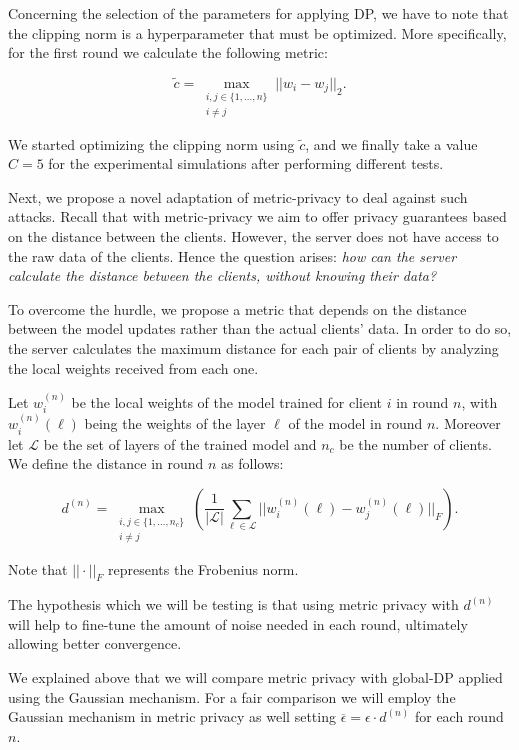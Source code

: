 \documentclass[5p,times]{elsarticle}
\begin{document}
Concerning the selection of the parameters for applying DP, we have to note that the clipping norm is a hyperparameter that must be optimized. More specifically, 
for the first round we calculate the following metric:

$$
\tilde{c} = \max_{\substack{i,j\in \{1,\hdots,n\} \\ i\neq j}}||w_{i}-w_{j}||_{2}.
$$

We started optimizing the clipping norm using $\tilde{c}$, and we finally take a value $C=5$ for the experimental simulations after performing different tests.



Next, we propose a novel adaptation of metric-privacy to deal against such attacks. 
Recall that with metric-privacy we aim to offer privacy guarantees based on the distance between the clients.
However, the server does not have access to the raw data of the clients. Hence the question arises: \emph{how can the server calculate the distance between the clients, without knowing their data?}

To overcome the hurdle, we propose a metric that depends on the distance between the model updates rather than the actual clients' data.
In order to do so, the server calculates the maximum distance for each pair of clients by analyzing the local weights received from each one. 

Let $w_{i}^{(n)}$ be the local weights of the model trained for client $i$ in round $n$, with $w_{i}^{(n)}(\ell)$ being the weights of the layer $\ell$ of the model in round $n$. Moreover let $\mathcal{L}$ be the set of layers of the trained model and $n_{c}$ be the number of clients. We define  the distance in round $n$  as follows:

$$
d^{(n)} = \max_{\substack{i,j\in \{1,\hdots,n_{c}\} \\ i\neq j}} \left(\frac{1}{|\mathcal{L}|}\sum_{\ell \in \mathcal{L}} ||w_{i}^{(n)}(\ell)-w_{j}^{(n)}(\ell)||_{F} \right).
$$

Note that $||\cdot||_{F}$ represents the Frobenius norm. 

The hypothesis which we will be testing is that using metric privacy with $d^{(n)}$ will help to fine-tune the amount of noise needed in each round, ultimately allowing better convergence. 

We explained above that we will compare metric privacy with global-DP applied using the Gaussian mechanism. For a fair comparison we will employ the Gaussian mechanism in metric privacy as well setting $\overline{\epsilon}=\epsilon \cdot d^{(n)}$ for each round $n$.
\end{document}
